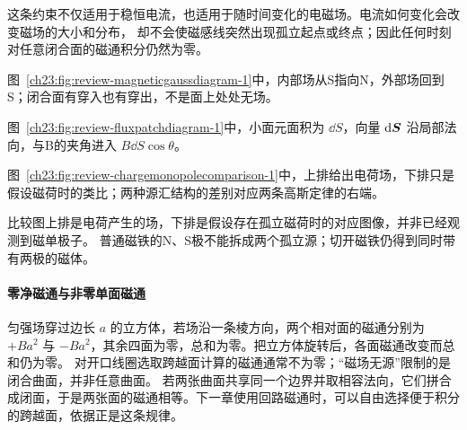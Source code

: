 {这条约束不仅适用于稳恒电流，也适用于随时间变化的电磁场。电流如何变化会改变磁场的大小和分布，
却不会使磁感线突然出现孤立起点或终点；因此任何时刻对任意闭合面的磁通积分仍然为零。

图~\ref{ch23:fig:review-magneticgaussdiagram-1}中，内部场从S指向N，外部场回到S；闭合面有穿入也有穿出，不是面上处处无场。
\par\noindent\begin{minipage}{\linewidth}
\magneticGaussDiagram
{}
\end{minipage}\par\medskip
图~\ref{ch23:fig:review-fluxpatchdiagram-1}中，小面元面积为 $\dd S$，向量 $\mathop{}\!\mathrm d\bm{S}$ 沿局部法向，与B的夹角进入 $B\dd S\cos\theta$。
\par\noindent\begin{minipage}{\linewidth}
\fluxPatchDiagram
{}
\end{minipage}\par\medskip
图~\ref{ch23:fig:review-chargemonopolecomparison-1}中，上排给出电荷场，下排只是假设磁荷时的类比；两种源汇结构的差别对应两条高斯定律的右端。
\par\noindent\begin{minipage}{\linewidth}
\chargeMonopoleComparison
{}
\end{minipage}\par\medskip
比较图上排是电荷产生的场，下排是假设存在孤立磁荷时的对应图像，并非已经观测到磁单极子。
普通磁铁的N、S极不能拆成两个孤立源；切开磁铁仍得到同时带有两极的磁体。



\paragraph{零净磁通与非零单面磁通}
匀强场穿过边长 $a$ 的立方体，若场沿一条棱方向，两个相对面的磁通分别为 $+Ba^2$ 与 $-Ba^2$，其余四面为零，总和为零。把立方体旋转后，各面磁通改变而总和仍为零。
对开口线圈选取跨越面计算的磁通通常不为零；“磁场无源”限制的是闭合曲面，并非任意曲面。
若两张曲面共享同一个边界并取相容法向，它们拼合成闭面，于是两张面的磁通相等。下一章使用回路磁通时，可以自由选择便于积分的跨越面，依据正是这条规律。


}
